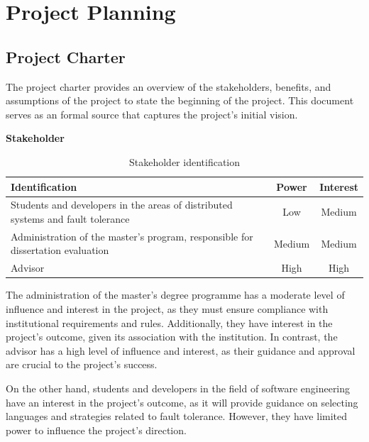 % 
\chapter{Project Planning} %
\label{chap:ProjectPlan}


\section{Project Charter}

The project charter provides an overview of the stakeholders, benefits, and assumptions of the project to state the beginning of the project. This document serves as an formal source that captures the project's initial vision.

\noindent \textbf{Stakeholder}

\begin{table}[h!]
      \centering
      \begin{tabular}{|p{11cm}|c|c|}
            \hline
            \textbf{Identification}                                                         & \textbf{Power} & \textbf{Interest} \\ \hline
            Students and developers in the areas of distributed systems and fault tolerance & Low            & Medium            \\ \hline
            Administration of the master's program, responsible for dissertation evaluation & Medium         & Medium            \\ \hline
            Advisor                                                                         & High           & High              \\ \hline
      \end{tabular}
      \caption{Stakeholder identification}
\end{table}

The administration of the master's degree programme has a moderate level of influence and interest in the project, as they must ensure compliance with institutional requirements and rules. Additionally, they have interest in the project's outcome, given its association with the institution. In contrast, the advisor has a high level of influence and interest, as their guidance and approval are crucial to the project's success. 

On the other hand, students and developers in the field of software engineering have an interest in the project's outcome, as it will provide guidance on selecting languages and strategies related to fault tolerance. However, they have limited power to influence the project's direction.

